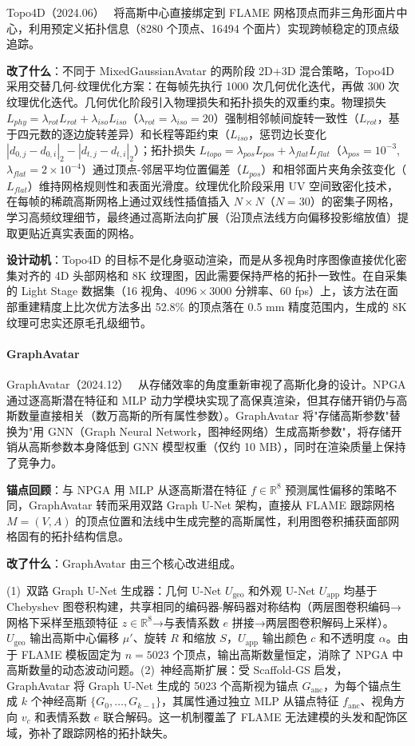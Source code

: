 Topo4D（2024.06）~\cite{2406_00440} 将高斯中心直接绑定到 FLAME 网格顶点而非三角形面片中心，利用预定义拓扑信息（8280 个顶点、16494 个面片）实现跨帧稳定的顶点级追踪。

\textbf{改了什么}：不同于 MixedGaussianAvatar 的两阶段 2D+3D 混合策略，Topo4D 采用交替几何-纹理优化方案：在每帧先执行 1000 次几何优化迭代，再做 300 次纹理优化迭代。几何优化阶段引入物理损失和拓扑损失的双重约束。物理损失 $L_{phy} = \lambda_{rot} L_{rot} + \lambda_{iso} L_{iso}$（$\lambda_{rot}=\lambda_{iso}=20$）强制相邻帧间旋转一致性（$L_{rot}$，基于四元数的逐边旋转差异）和长程等距约束（$L_{iso}$，惩罚边长变化 $|d_{0,j} - d_{0,i}|_2 - |d_{t,j} - d_{t,i}|_2$）；拓扑损失 $L_{topo} = \lambda_{pos} L_{pos} + \lambda_{flat} L_{flat}$（$\lambda_{pos}=10^{-3}$, $\lambda_{flat}=2 \times 10^{-4}$）通过顶点-邻居平均位置偏差（$L_{pos}$）和相邻面片夹角余弦变化（$L_{flat}$）维持网格规则性和表面光滑度。纹理优化阶段采用 UV 空间致密化技术，在每帧的稀疏高斯网格上通过双线性插值插入 $N \times N$（$N=30$）的密集子网格，学习高频纹理细节，最终通过高斯法向扩展（沿顶点法线方向偏移投影缩放值）提取更贴近真实表面的网格。

\textbf{设计动机}：Topo4D 的目标不是化身驱动渲染，而是从多视角时序图像直接优化密集对齐的 4D 头部网格和 8K 纹理图，因此需要保持严格的拓扑一致性。在自采集的 Light Stage 数据集（16 视角、$4096 \times 3000$ 分辨率、60 fps）上，该方法在面部重建精度上比次优方法多出 52.8\% 的顶点落在 0.5 mm 精度范围内，生成的 8K 纹理可忠实还原毛孔级细节。

\paragraph{GraphAvatar}

GraphAvatar（2024.12）~\cite{2412_13983} 从存储效率的角度重新审视了高斯化身的设计。NPGA 通过逐高斯潜在特征和 MLP 动力学模块实现了高保真渲染，但其存储开销仍与高斯数量直接相关（数万高斯的所有属性参数）。GraphAvatar 将"存储高斯参数"替换为"用 GNN（Graph Neural Network，图神经网络）生成高斯参数"，将存储开销从高斯参数本身降低到 GNN 模型权重（仅约 10 MB），同时在渲染质量上保持了竞争力。

\textbf{锚点回顾}：与 NPGA 用 MLP 从逐高斯潜在特征 $f \in \mathbb{R}^8$ 预测属性偏移的策略不同，GraphAvatar 转而采用双路 Graph U-Net 架构，直接从 FLAME 跟踪网格 $M = (V, A)$ 的顶点位置和法线中生成完整的高斯属性，利用图卷积捕获面部网格固有的拓扑结构信息。

\textbf{改了什么}：GraphAvatar 由三个核心改进组成。

(1)~双路 Graph U-Net 生成器：几何 U-Net $U_{\text{geo}}$ 和外观 U-Net $U_{\text{app}}$ 均基于 Chebyshev 图卷积构建，共享相同的编码器-解码器对称结构（两层图卷积编码→网格下采样至瓶颈特征 $z \in \mathbb{R}^8$→与表情系数 $e$ 拼接→两层图卷积解码上采样）。$U_{\text{geo}}$ 输出高斯中心偏移 $\mu'$、旋转 $R$ 和缩放 $S$，$U_{\text{app}}$ 输出颜色 $c$ 和不透明度 $\alpha$。由于 FLAME 模板固定为 $n = 5023$ 个顶点，输出高斯数量恒定，消除了 NPGA 中高斯数量的动态波动问题。(2)~神经高斯扩展：受 Scaffold-GS 启发，GraphAvatar 将 Graph U-Net 生成的 5023 个高斯视为锚点 $G_{\text{anc}}$，为每个锚点生成 $k$ 个神经高斯 $\{G_0, \ldots, G_{k-1}\}$，其属性通过独立 MLP 从锚点特征 $f_{\text{anc}}$、视角方向 $v_c$ 和表情系数 $e$ 联合解码。这一机制覆盖了 FLAME 无法建模的头发和配饰区域，弥补了跟踪网格的拓扑缺失。

